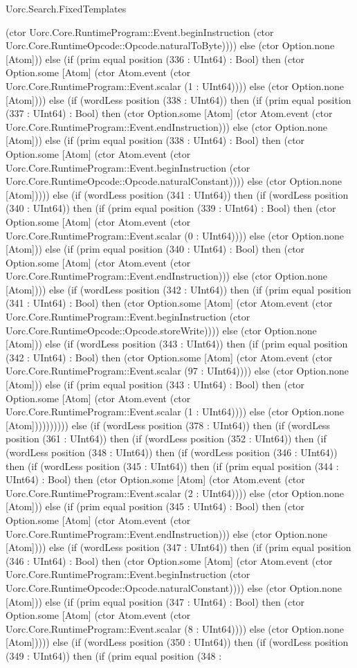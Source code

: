 \begin{lexlean}{Uorc.Search.FixedTemplates}
\begin{semanticmodule}
{(ctor Uorc.Core.RuntimeProgram::Event.beginInstruction (ctor Uorc.Core.RuntimeOpcode::Opcode.naturalToByte)))) else (ctor Option.none [Atom])) else (if (prim equal position (336 : UInt64) : Bool) then (ctor Option.some [Atom] (ctor Atom.event (ctor Uorc.Core.RuntimeProgram::Event.scalar (1 : UInt64)))) else (ctor Option.none [Atom]))) else (if (wordLess position (338 : UInt64)) then (if (prim equal position (337 : UInt64) : Bool) then (ctor Option.some [Atom] (ctor Atom.event (ctor Uorc.Core.RuntimeProgram::Event.endInstruction))) else (ctor Option.none [Atom])) else (if (prim equal position (338 : UInt64) : Bool) then (ctor Option.some [Atom] (ctor Atom.event (ctor Uorc.Core.RuntimeProgram::Event.beginInstruction (ctor Uorc.Core.RuntimeOpcode::Opcode.naturalConstant)))) else (ctor Option.none [Atom])))) else (if (wordLess position (341 : UInt64)) then (if (wordLess position (340 : UInt64)) then (if (prim equal position (339 : UInt64) : Bool) then (ctor Option.some [Atom] (ctor Atom.event (ctor Uorc.Core.RuntimeProgram::Event.scalar (0 : UInt64)))) else (ctor Option.none [Atom])) else (if (prim equal position (340 : UInt64) : Bool) then (ctor Option.some [Atom] (ctor Atom.event (ctor Uorc.Core.RuntimeProgram::Event.endInstruction))) else (ctor Option.none [Atom]))) else (if (wordLess position (342 : UInt64)) then (if (prim equal position (341 : UInt64) : Bool) then (ctor Option.some [Atom] (ctor Atom.event (ctor Uorc.Core.RuntimeProgram::Event.beginInstruction (ctor Uorc.Core.RuntimeOpcode::Opcode.storeWrite)))) else (ctor Option.none [Atom])) else (if (wordLess position (343 : UInt64)) then (if (prim equal position (342 : UInt64) : Bool) then (ctor Option.some [Atom] (ctor Atom.event (ctor Uorc.Core.RuntimeProgram::Event.scalar (97 : UInt64)))) else (ctor Option.none [Atom])) else (if (prim equal position (343 : UInt64) : Bool) then (ctor Option.some [Atom] (ctor Atom.event (ctor Uorc.Core.RuntimeProgram::Event.scalar (1 : UInt64)))) else (ctor Option.none [Atom]))))))))) else (if (wordLess position (378 : UInt64)) then (if (wordLess position (361 : UInt64)) then (if (wordLess position (352 : UInt64)) then (if (wordLess position (348 : UInt64)) then (if (wordLess position (346 : UInt64)) then (if (wordLess position (345 : UInt64)) then (if (prim equal position (344 : UInt64) : Bool) then (ctor Option.some [Atom] (ctor Atom.event (ctor Uorc.Core.RuntimeProgram::Event.scalar (2 : UInt64)))) else (ctor Option.none [Atom])) else (if (prim equal position (345 : UInt64) : Bool) then (ctor Option.some [Atom] (ctor Atom.event (ctor Uorc.Core.RuntimeProgram::Event.endInstruction))) else (ctor Option.none [Atom]))) else (if (wordLess position (347 : UInt64)) then (if (prim equal position (346 : UInt64) : Bool) then (ctor Option.some [Atom] (ctor Atom.event (ctor Uorc.Core.RuntimeProgram::Event.beginInstruction (ctor Uorc.Core.RuntimeOpcode::Opcode.naturalConstant)))) else (ctor Option.none [Atom])) else (if (prim equal position (347 : UInt64) : Bool) then (ctor Option.some [Atom] (ctor Atom.event (ctor Uorc.Core.RuntimeProgram::Event.scalar (8 : UInt64)))) else (ctor Option.none [Atom])))) else (if (wordLess position (350 : UInt64)) then (if (wordLess position (349 : UInt64)) then (if (prim equal position (348 : }
\end{semanticmodule}
\end{lexlean}
